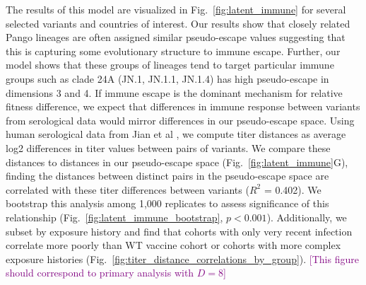 \documentclass[11pt,oneside,letterpaper]{article}
\def\tbc#1{\textcolor{purple}{[#1]}}
\begin{document}
The results of this model are visualized in Fig.~\ref{fig:latent_immune} for several selected variants and countries of interest.
Our results show that closely related Pango lineages are often assigned similar pseudo-escape values suggesting that this is capturing some evolutionary structure to immune escape.
Further, our model shows that these groups of lineages tend to target particular immune groups such as clade 24A (JN.1, JN.1.1, JN.1.4) has high pseudo-escape in dimensions 3 and 4.
If immune escape is the dominant mechanism for relative fitness difference, we expect that differences in immune response between variants from serological data would mirror differences in our pseudo-escape space.
Using human serological data from Jian et al \cite{Jian2023}, we compute titer distances as average log2 differences in titer values between pairs of variants.
We compare these distances to distances in our pseudo-escape space (Fig.~\ref{fig:latent_immune}G), finding the distances between distinct pairs in the pseudo-escape space are correlated with these titer differences between variants ($R^2$ = 0.402).
We bootstrap this analysis among 1,000 replicates to assess significance of this relationship (Fig.~\ref{fig:latent_immune_bootstrap}, $p < 0.001$).
Additionally, we subset by exposure history and find that cohorts with only very recent infection correlate more poorly than WT vaccine cohort or cohorts with more complex exposure histories (Fig.~\ref{fig:titer_distance_correlations_by_group}).
\tbc{This figure should correspond to primary analysis with $D=8$}
\end{document}
